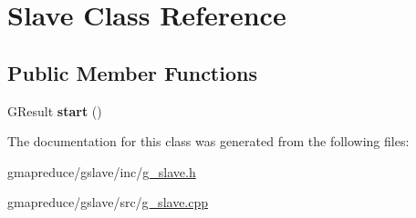 \hypertarget{class_slave}{\section{Slave Class Reference}
\label{class_slave}
}
\subsection*{Public Member Functions}
\begin{DoxyCompactItemize}
\item 
\hypertarget{class_slave_abf43c4cf118cc76bb40df9fd71ffd8c1}{G\-Result {\bfseries start} ()}\label{class_slave_abf43c4cf118cc76bb40df9fd71ffd8c1}

\end{DoxyCompactItemize}


The documentation for this class was generated from the following files\-:\begin{DoxyCompactItemize}
\item 
gmapreduce/gslave/inc/\hyperlink{g__slave_8h}{g\-\_\-slave.\-h}\item 
gmapreduce/gslave/src/\hyperlink{g__slave_8cpp}{g\-\_\-slave.\-cpp}\end{DoxyCompactItemize}
